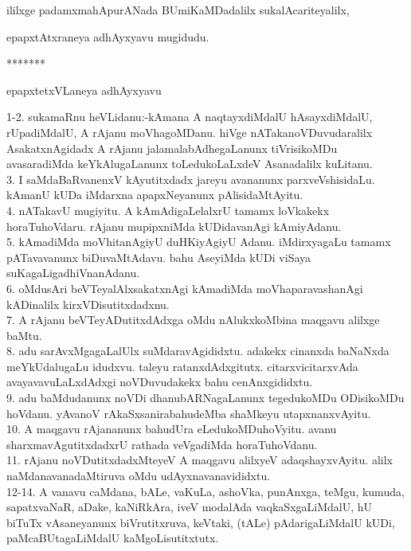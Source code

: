 \documentclass{article}
\begin{document}
\begin{center}
ililxge padamxmahApurANada BUmiKaMDadalilx sukalAcariteyalilx,
\end{center}

\begin{center}
epapxtAtxraneya adhAyxyavu mugidudu.
\end{center}

\begin{center}
*******
\end{center}

\begin{center}
epapxtetxVLaneya adhAyxyavu
\end{center}

1-2. sukamaRnu heVLidanu:-kAmana A naqtayxdiMdalU hAsayxdiMdalU, rUpadiMdalU, A rAjanu moVhagoMDanu. hiVge nATakanoVDuvudaralilx AsakatxnAgidadx A rAjanu jalamalabAdhegaLanunx tiVrisikoMDu avasaradiMda keYkAlugaLanunx toLedukoLaLxdeV Asanadalilx kuLitanu.\\
3. I saMdaBaRvanenxV kAyutitxdadx jareyu avananunx parxveVshisidaLu. kAmanU kUDa iMdarxna apapxNeyanunx pAlisidaMtAyitu.\\
4. nATakavU mugiyitu. A kAmAdigaLelalxrU tamamx loVkakekx horaTuhoVdaru. rAjanu mupipxniMda kUDidavanAgi kAmiyAdanu.\\
5. kAmadiMda moVhitanAgiyU duHKiyAgiyU Adanu. iMdirxyagaLu tamamx pATavavanunx biDuvaMtAdavu. bahu AseyiMda kUDi viSaya suKagaLigadhiVnanAdanu.\\
6. oMdusAri beVTeyalAlxsakatxnAgi kAmadiMda moVhaparavashanAgi kADinalilx kirxVDisutitxdadxnu.\\
7. A rAjanu beVTeyADutitxdAdxga oMdu nAlukxkoMbina maqgavu alilxge baMtu.\\
8. adu sarAvxMgagaLalUlx suMdaravAgididxtu. adakekx cinanxda baNaNxda meYkUdalugaLu idudxvu. taleyu ratanxdAdxgitutx. citarxvicitarxvAda avayavavuLaLxdAdxgi noVDuvudakekx bahu cenAnxgididxtu.\\
9. adu baMdudanunx noVDi dhanubARNagaLanunx tegedukoMDu ODisikoMDu hoVdanu. yAvanoV rAkaSxsanirabahudeMba shaMkeyu utapxnanxvAyitu.\\
10. A maqgavu rAjananunx bahudUra eLedukoMDuhoVyitu. avanu sharxmavAgutitxdadxrU rathada veVgadiMda horaTuhoVdanu.\\
11. rAjanu noVDutitxdadxMteyeV A maqgavu alilxyeV adaqshayxvAyitu. alilx naMdanavanadaMtiruva oMdu udAyxnavanavididxtu.\\
12-14. A vanavu caMdana, bALe, vaKuLa, ashoVka, punAnxga, teMgu, kumuda, sapatxvaNaR, aDake, kaNiRkAra, iveV modalAda vaqkaSxgaLiMdalU, hU biTuTx vAsaneyanunx biVrutitxruva, keVtaki, (tALe) pAdarigaLiMdalU kUDi, paMcaBUtagaLiMdalU kaMgoLisutitxtutx.\\
\end{document}
